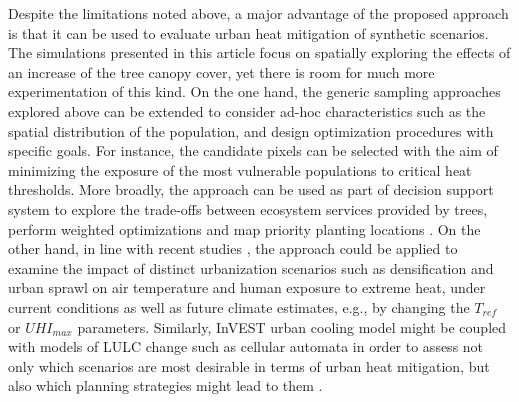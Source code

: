 \documentclass[10pt,letterpaper]{article}
\begin{document}
Despite the limitations noted above, a major advantage of the proposed approach is that it can be used to evaluate urban heat mitigation of synthetic scenarios.
The simulations presented in this article focus on spatially exploring the effects of an increase of the tree canopy cover, yet there is room for much more experimentation of this kind.
On the one hand, the generic sampling approaches explored above can be extended to consider ad-hoc characteristics such as the spatial distribution of the population, and design optimization procedures with specific goals. For instance, the candidate pixels can be selected with the aim of minimizing the exposure of the most vulnerable populations to critical heat thresholds.
More broadly, the approach can be used as part of decision support system to explore the trade-offs between ecosystem services provided by trees, perform weighted optimizations and map priority planting locations \cite{bodnaruk2017plant,werbin2020tree}.
On the other hand, in line with recent studies \cite{lemonsu2015vulnerability,yang2016contrasting,trimmel2019thermal}, the approach could be applied to examine the impact of distinct urbanization scenarios such as densification and urban sprawl on air temperature and human exposure to extreme heat, under current conditions as well as future climate estimates, e.g., by changing the $T_{ref}$ or $UHI_{max}$ parameters.
Similarly, InVEST urban cooling model might be coupled with models of LULC change such as cellular automata in order to assess not only which scenarios are most desirable in terms of urban heat mitigation, but also which planning strategies might lead to them \cite{silva2008strategies,white2015modeling,bosch2019addressing}.
\end{document}
